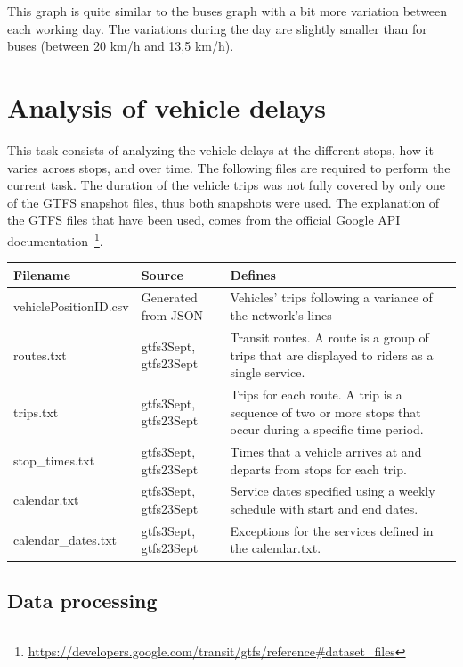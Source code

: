 \documentclass{article}
\begin{document}
This graph is quite similar to the buses graph with a bit more variation between each working day. The variations during the day are slightly smaller than for buses (between 20 km/h and 13,5 km/h).

\section{Analysis of vehicle delays}

This task consists of analyzing the vehicle delays at the different stops, how it varies across stops, and over time. The following files are required to perform the current task. The duration of the vehicle trips was not fully covered by only one of the GTFS snapshot files, thus both snapshots were used. The explanation of the GTFS files that have been used, comes from the official Google API documentation~\footnote{\url{https://developers.google.com/transit/gtfs/reference\#dataset_files}}.

\begin{center}
\begin{tabular}{|l|l|m{9cm}|} 
 \hline
 Filename & Source & Defines \\ [0.5ex] 
 \hline\hline
vehiclePositionID.csv & Generated from JSON & Vehicles' trips following a variance of the network's lines\\ 
 \hline
routes.txt & gtfs3Sept, gtfs23Sept & Transit routes. A route is a group of trips that are displayed to riders as a single service.  \\
 \hline
trips.txt & gtfs3Sept, gtfs23Sept & Trips for each route. A trip is a sequence of two or more stops that occur during a specific time period.  \\
 \hline
stop\_times.txt & gtfs3Sept, gtfs23Sept & Times that a vehicle arrives at and departs from stops for each trip.  \\
 \hline
calendar.txt & gtfs3Sept, gtfs23Sept & Service dates specified using a weekly schedule with start and end dates. \\
 \hline
calendar\_dates.txt  & gtfs3Sept, gtfs23Sept & Exceptions for the services defined in the calendar.txt. \\
 \hline
\end{tabular}
\end{center}

\subsection{Data processing}
\end{document}
